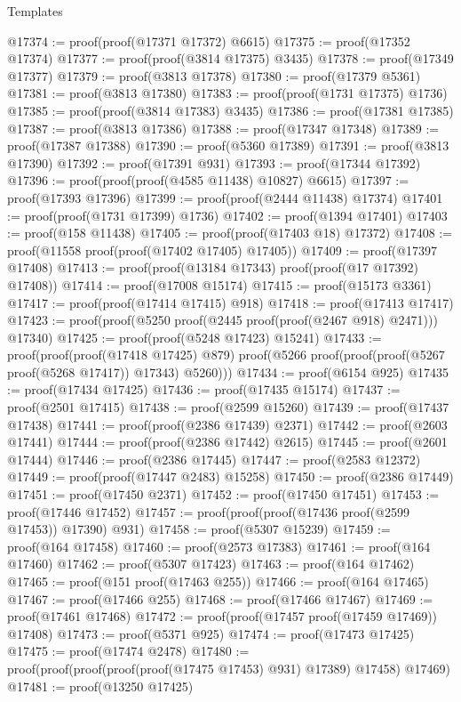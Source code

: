 \begin{lexlean}{Templates}
\begin{coremodule}
@17374 := proof(proof(@17371 @17372) @6615)
@17375 := proof(@17352 @17374)
@17377 := proof(proof(@3814 @17375) @3435)
@17378 := proof(@17349 @17377)
@17379 := proof(@3813 @17378)
@17380 := proof(@17379 @5361)
@17381 := proof(@3813 @17380)
@17383 := proof(proof(@1731 @17375) @1736)
@17385 := proof(proof(@3814 @17383) @3435)
@17386 := proof(@17381 @17385)
@17387 := proof(@3813 @17386)
@17388 := proof(@17347 @17348)
@17389 := proof(@17387 @17388)
@17390 := proof(@5360 @17389)
@17391 := proof(@3813 @17390)
@17392 := proof(@17391 @931)
@17393 := proof(@17344 @17392)
@17396 := proof(proof(proof(@4585 @11438) @10827) @6615)
@17397 := proof(@17393 @17396)
@17399 := proof(proof(@2444 @11438) @17374)
@17401 := proof(proof(@1731 @17399) @1736)
@17402 := proof(@1394 @17401)
@17403 := proof(@158 @11438)
@17405 := proof(proof(@17403 @18) @17372)
@17408 := proof(@11558 proof(proof(@17402 @17405) @17405))
@17409 := proof(@17397 @17408)
@17413 := proof(proof(@13184 @17343) proof(proof(@17 @17392) @17408))
@17414 := proof(@17008 @15174)
@17415 := proof(@15173 @3361)
@17417 := proof(proof(@17414 @17415) @918)
@17418 := proof(@17413 @17417)
@17423 := proof(proof(@5250 proof(@2445 proof(proof(@2467 @918) @2471))) @17340)
@17425 := proof(proof(@5248 @17423) @15241)
@17433 := proof(proof(proof(@17418 @17425) @879)
      proof(@5266 proof(proof(proof(@5267 proof(@5268 @17417)) @17343) @5260)))
@17434 := proof(@6154 @925)
@17435 := proof(@17434 @17425)
@17436 := proof(@17435 @15174)
@17437 := proof(@2501 @17415)
@17438 := proof(@2599 @15260)
@17439 := proof(@17437 @17438)
@17441 := proof(proof(@2386 @17439) @2371)
@17442 := proof(@2603 @17441)
@17444 := proof(proof(@2386 @17442) @2615)
@17445 := proof(@2601 @17444)
@17446 := proof(@2386 @17445)
@17447 := proof(@2583 @12372)
@17449 := proof(proof(@17447 @2483) @15258)
@17450 := proof(@2386 @17449)
@17451 := proof(@17450 @2371)
@17452 := proof(@17450 @17451)
@17453 := proof(@17446 @17452)
@17457 := proof(proof(proof(@17436 proof(@2599 @17453)) @17390) @931)
@17458 := proof(@5307 @15239)
@17459 := proof(@164 @17458)
@17460 := proof(@2573 @17383)
@17461 := proof(@164 @17460)
@17462 := proof(@5307 @17423)
@17463 := proof(@164 @17462)
@17465 := proof(@151 proof(@17463 @255))
@17466 := proof(@164 @17465)
@17467 := proof(@17466 @255)
@17468 := proof(@17466 @17467)
@17469 := proof(@17461 @17468)
@17472 := proof(proof(@17457 proof(@17459 @17469)) @17408)
@17473 := proof(@5371 @925)
@17474 := proof(@17473 @17425)
@17475 := proof(@17474 @2478)
@17480 := proof(proof(proof(proof(proof(@17475 @17453) @931) @17389) @17458) @17469)
@17481 := proof(@13250 @17425)

\end{coremodule}
\end{lexlean}
